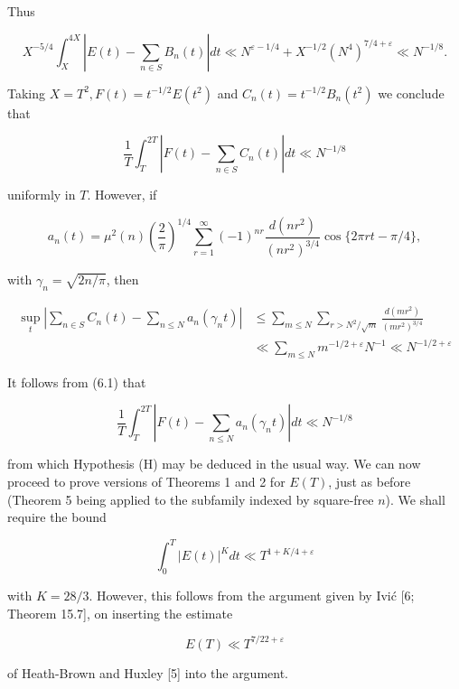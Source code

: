 \documentclass[10pt]{article}
\begin{document}
Thus

$$
X^{-5 / 4} \int_{X}^{4 X}\left|E(t)-\sum_{n \in S} B_{n}(t)\right| d t \ll N^{\varepsilon-1 / 4}+X^{-1 / 2}\left(N^{4}\right)^{7 / 4+\varepsilon} \ll N^{-1 / 8} .
$$

Taking $X=T^{2}, F(t)=t^{-1 / 2} E\left(t^{2}\right)$ and $C_{n}(t)=t^{-1 / 2} B_{n}\left(t^{2}\right)$ we conclude that


\begin{equation*}
\frac{1}{T} \int_{T}^{2 T}\left|F(t)-\sum_{n \in S} C_{n}(t)\right| d t \ll N^{-1 / 8} \tag{6.1}
\end{equation*}


uniformly in $T$. However, if

$$
a_{n}(t)=\mu^{2}(n)\left(\frac{2}{\pi}\right)^{1 / 4} \sum_{r=1}^{\infty}(-1)^{n r} \frac{d\left(n r^{2}\right)}{\left(n r^{2}\right)^{3 / 4}} \cos \{2 \pi r t-\pi / 4\},
$$

with $\gamma_{n}=\sqrt{2 n / \pi}$, then


\begin{align*}
\sup _{t}\left|\sum_{n \in S} C_{n}(t)-\sum_{n \leq N} a_{n}\left(\gamma_{n} t\right)\right| & \leq \sum_{m \leq N} \sum_{r>N^{2} / \sqrt{m}} \frac{d\left(m r^{2}\right)}{\left(m r^{2}\right)^{3 / 4}} \tag{6.2}\\
& \ll \sum_{m \leq N} m^{-1 / 2+\varepsilon} N^{-1} \ll N^{-1 / 2+\varepsilon}
\end{align*}


It follows from (6.1) that

$$
\frac{1}{T} \int_{T}^{2 T}\left|F(t)-\sum_{n \leq N} a_{n}\left(\gamma_{n} t\right)\right| d t \ll N^{-1 / 8}
$$

from which Hypothesis (H) may be deduced in the usual way. We can now proceed to prove versions of Theorems 1 and 2 for $E(T)$, just as before (Theorem 5 being applied to the subfamily indexed by square-free $n$). We shall require the bound

$$
\int_{0}^{T}|E(t)|^{K} d t \ll T^{1+K / 4+\varepsilon}
$$

with $K=28 / 3$. However, this follows from the argument given by Ivić [6; Theorem 15.7], on inserting the estimate

$$
E(T) \ll T^{7 / 22+\varepsilon}
$$

of Heath-Brown and Huxley [5] into the argument.
\end{document}

